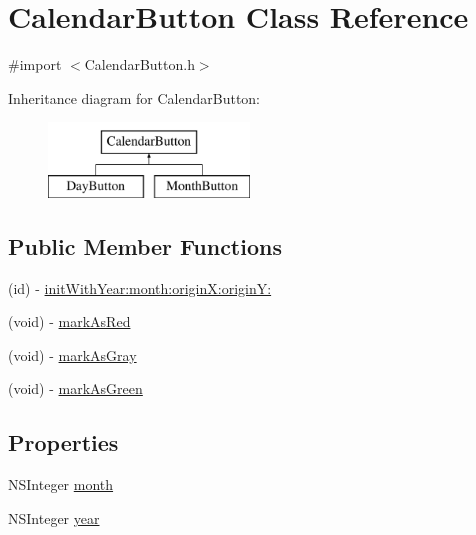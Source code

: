 \hypertarget{interface_calendar_button}{\section{\-Calendar\-Button \-Class \-Reference}
\label{interface_calendar_button}
}


{\ttfamily \#import $<$\-Calendar\-Button.\-h$>$}

\-Inheritance diagram for \-Calendar\-Button\-:\begin{figure}[H]
\begin{center}
\leavevmode
\includegraphics[height=2.000000cm]{interface_calendar_button}
\end{center}
\end{figure}
\subsection*{\-Public \-Member \-Functions}
\begin{DoxyCompactItemize}
\item 
(id) -\/ \hyperlink{interface_calendar_button_a575053cfafe6a9790ff7b823e67cdd8f}{init\-With\-Year\-:month\-:origin\-X\-:origin\-Y\-:}
\item 
(void) -\/ \hyperlink{interface_calendar_button_ac19bd8ddd5723e4700bfd15bc31791e6}{mark\-As\-Red}
\item 
(void) -\/ \hyperlink{interface_calendar_button_a588a452598d23eeeeb201003fbab896e}{mark\-As\-Gray}
\item 
(void) -\/ \hyperlink{interface_calendar_button_adb8abbee02c42e396d6d23eb61bd9d1f}{mark\-As\-Green}
\end{DoxyCompactItemize}
\subsection*{\-Properties}
\begin{DoxyCompactItemize}
\item 
\-N\-S\-Integer \hyperlink{interface_calendar_button_a0376fff10e4b7543fda1c00b81585828}{month}
\item 
\-N\-S\-Integer \hyperlink{interface_calendar_button_ad84a0f3277c87c767e149d4498bb94b2}{year}
\end{DoxyCompactItemize}


